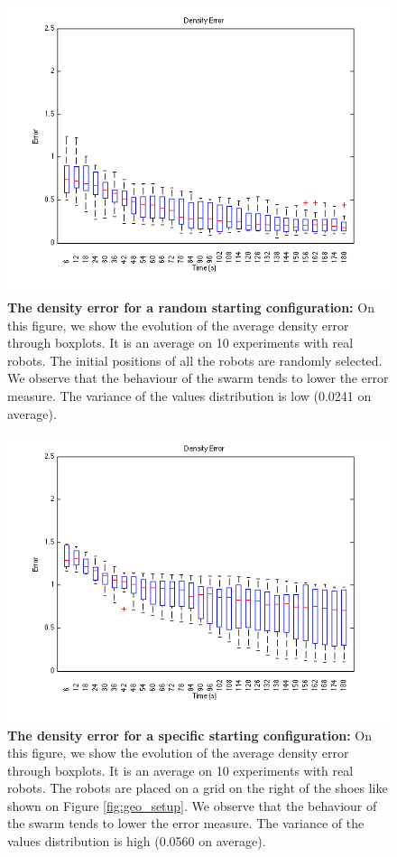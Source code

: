 \documentclass[oneside, a4paper, 12pt]{memoir}
\let\oldCaption\caption
\renewcommand{\caption}[2]{
\oldCaption[#1]{{\small\sffamily\bfseries #1:} #2}
}
\begin{document}
				\begin{figure}[!htp]
					\includegraphics[width=\textwidth]{../MATLAB/boxplot_random_density.png}
					\caption{The density error for a random starting configuration}{On this figure, we show the evolution of the average density error through boxplots. It is an average on 10 experiments with real robots. The initial positions of all the robots are randomly selected. We observe that the behaviour of the swarm tends to lower the error measure. The variance of the values distribution is low (0.0241 on average).}
					\label{fig:boxplot_random_density}
				\end{figure}
			
				
				\begin{figure}[!htp]
					\includegraphics[width=\textwidth]{../MATLAB/boxplot_geo2_density.png}
					\caption{The density error for a specific starting configuration}{On this figure, we show the evolution of the average density error through boxplots. It is an average on 10 experiments with real robots. The robots are placed on a grid on the right of the shoes like shown on Figure \ref{fig:geo_setup}. We observe that the behaviour of the swarm tends to lower the error measure. The variance of the values distribution is high (0.0560 on average).}
					\label{fig:boxplot_geo_density}
				\end{figure}
				
\end{document}
